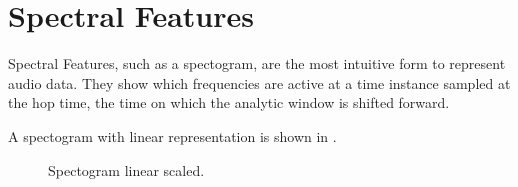 
\section{Spectral Features}\label{sec:signal_spec}
Spectral Features, such as a spectogram, are the most intuitive form to represent audio data. 
They show which frequencies are active at a time instance sampled at the hop time, the time on which the analytic window is shifted forward.

A spectogram with linear representation is shown in .

\begin{figure}[!ht]
  \centering
  \caption{Spectogram linear scaled.}
  \label{fig:spec-lin}
\end{figure}
\FloatBarrier
\noindent

